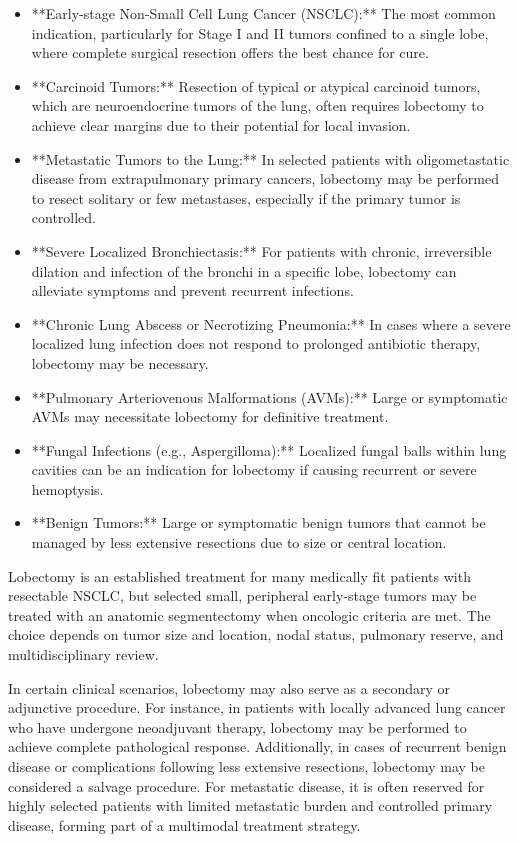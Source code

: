 \begin{itemize}
  \item **Early-stage Non-Small Cell Lung Cancer (NSCLC):** The most common indication, particularly for Stage I and II tumors confined to a single lobe, where complete surgical resection offers the best chance for cure.
  \item **Carcinoid Tumors:** Resection of typical or atypical carcinoid tumors, which are neuroendocrine tumors of the lung, often requires lobectomy to achieve clear margins due to their potential for local invasion.
  \item **Metastatic Tumors to the Lung:** In selected patients with oligometastatic disease from extrapulmonary primary cancers, lobectomy may be performed to resect solitary or few metastases, especially if the primary tumor is controlled.
  \item **Severe Localized Bronchiectasis:** For patients with chronic, irreversible dilation and infection of the bronchi in a specific lobe, lobectomy can alleviate symptoms and prevent recurrent infections.
  \item **Chronic Lung Abscess or Necrotizing Pneumonia:** In cases where a severe localized lung infection does not respond to prolonged antibiotic therapy, lobectomy may be necessary.
  \item **Pulmonary Arteriovenous Malformations (AVMs):** Large or symptomatic AVMs may necessitate lobectomy for definitive treatment.
  \item **Fungal Infections (e.g., Aspergilloma):** Localized fungal balls within lung cavities can be an indication for lobectomy if causing recurrent or severe hemoptysis.
  \item **Benign Tumors:** Large or symptomatic benign tumors that cannot be managed by less extensive resections due to size or central location.
\end{itemize}

Lobectomy is an established treatment for many medically fit patients with resectable NSCLC, but selected small, peripheral early-stage tumors may be treated with an anatomic segmentectomy when oncologic criteria are met. The choice depends on tumor size and location, nodal status, pulmonary reserve, and multidisciplinary review.

In certain clinical scenarios, lobectomy may also serve as a secondary or adjunctive procedure. For instance, in patients with locally advanced lung cancer who have undergone neoadjuvant therapy, lobectomy may be performed to achieve complete pathological response. Additionally, in cases of recurrent benign disease or complications following less extensive resections, lobectomy may be considered a salvage procedure. For metastatic disease, it is often reserved for highly selected patients with limited metastatic burden and controlled primary disease, forming part of a multimodal treatment strategy.


